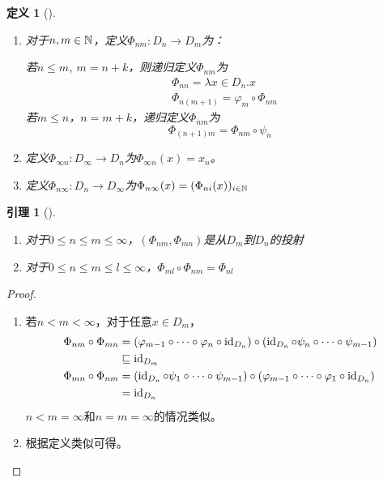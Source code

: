 \documentclass[11pt]{article}
\newtheorem{lemma}[theorem]{引理}
\newtheorem{definition}[theorem]{定义}
\begin{document}
\begin{definition}[]
\begin{enumerate}
\item 对于\(n,m\in\mathbb{N}\)，定义\(\Phi_{nm}:D_n\to D_m\)为：

若\(n\le m\), \(m=n+k\)，则递归定义\(\Phi_{nm}\)为
\begin{align*}
&\Phi_{nn}=\lambda x\in D_n.x\\
&\Phi_{n(m+1)}=\varphi_m\circ\Phi_{nm}
\end{align*}
若\(m\le n\)，\(n=m+k\)，递归定义\(\Phi_{nm}\)为
\begin{equation*}
\Phi_{(n+1)m}=\Phi_{nm}\circ\psi_n
\end{equation*}
\item 定义\(\Phi_{\infty n}:D_\infty\to D_n\)为\(\Phi_{\infty n}(x)=x_n\)。
\item 定义\(\Phi_{n\infty}:D_n\to D_\infty\)为\(\Phi_{n\infty}(x)=(\Phi_{ni}(x))_{i\in\mathbb{N}}\)
\end{enumerate}
\end{definition}

\begin{lemma}[]
\begin{enumerate}
\item 对于\(0\le n\le m\le\infty\)，\((\Phi_{nm},\Phi_{mn})\)是从\(D_m\)到\(D_n\)的投射
\item 对于\(0\le n\le m\le l\le\infty\)，\(\Phi_{ml}\circ\Phi_{nm}=\Phi_{nl}\)
\end{enumerate}
\end{lemma}

\begin{proof}
\begin{enumerate}
\item 若\(n<m<\infty\)，对于任意\(x\in D_m\)，
\begin{align*}
\Phi_{nm}\circ\Phi_{mn}&=(\varphi_{m-1}\circ\dots\circ\varphi_n\circ\operatorname{id}_{D_n})\circ(\operatorname{id}_{D_n}\circ\psi_n\circ\dots\circ\psi_{m-1})\\
&\sqsubseteq\operatorname{id}_{D_m}\\
\Phi_{mn}\circ\Phi_{nm}&=(\operatorname{id}_{D_n}\circ\psi_1\circ\dots\circ\psi_{m-1})\circ(\varphi_{m-1}\circ\dots\circ\varphi_1\circ\operatorname{id}_{D_n})\\
&=\operatorname{id}_{D_n}
\end{align*}
\(n<m=\infty\)和\(n=m=\infty\)的情况类似。
\item 根据定义类似可得。
\end{enumerate}
\end{proof}
\end{document}
